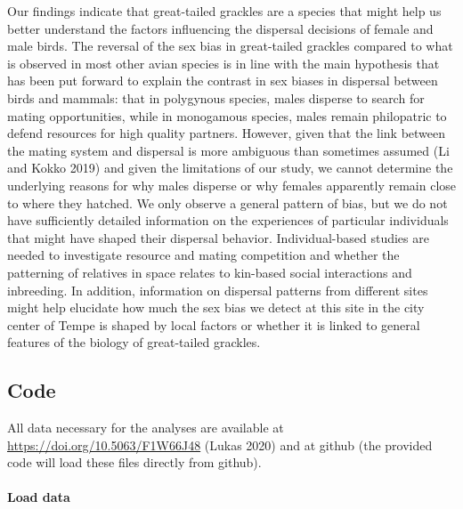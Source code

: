 \documentclass[]{article}
\let\oldparagraph\paragraph
\renewcommand{\paragraph}[1]{\oldparagraph{#1}\mbox{}}
\begin{document}
Our findings indicate that great-tailed grackles are a species that
might help us better understand the factors influencing the dispersal
decisions of female and male birds. The reversal of the sex bias in
great-tailed grackles compared to what is observed in most other avian
species is in line with the main hypothesis that has been put forward to
explain the contrast in sex biases in dispersal between birds and
mammals: that in polygynous species, males disperse to search for mating
opportunities, while in monogamous species, males remain philopatric to
defend resources for high quality partners. However, given that the link
between the mating system and dispersal is more ambiguous than sometimes
assumed (Li and Kokko 2019) and given the limitations of our study, we
cannot determine the underlying reasons for why males disperse or why
females apparently remain close to where they hatched. We only observe a
general pattern of bias, but we do not have sufficiently detailed
information on the experiences of particular individuals that might have
shaped their dispersal behavior. Individual-based studies are needed to
investigate resource and mating competition and whether the patterning
of relatives in space relates to kin-based social interactions and
inbreeding. In addition, information on dispersal patterns from
different sites might help elucidate how much the sex bias we detect at
this site in the city center of Tempe is shaped by local factors or
whether it is linked to general features of the biology of great-tailed
grackles.

\newpage

\hypertarget{code}{%
\subsection{Code}\label{code}}

All data necessary for the analyses are available at
\url{https://doi.org/10.5063/F1W66J48} (Lukas 2020) and at github (the
provided code will load these files directly from github).

\hypertarget{load-data}{%
\paragraph{Load data}\label{load-data}}
\end{document}
